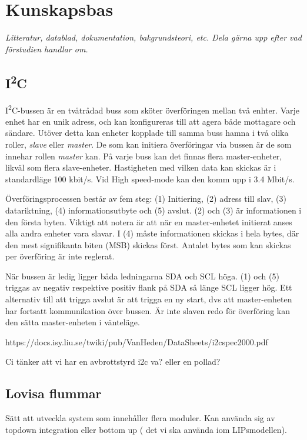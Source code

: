 \documentclass[11pt]{article}
\begin{document}
\begin{flushleft}
\begin{itemize}
\end{itemize}

\pagebreak

\section{Kunskapsbas}
\textit{Litteratur, datablad, dokumentation, bakgrundsteori, etc. Dela gärna upp efter vad förstudien handlar om.}

\subsection{I\textsuperscript{2}C}
I\textsuperscript{2}C-bussen är en tvåtrådad buss som sköter överföringen mellan två enhter. Varje enhet har en unik adress, och kan konfigureras till att agera både mottagare och sändare. Utöver detta kan enheter kopplade till samma buss hamna i två olika roller, \textit{slave} eller \textit{master}. De som kan initiera överföringar via bussen är de som innehar rollen \textit{master} kan. På varje buss kan det finnas flera master-enheter, likväl som flera slave-enheter. Hastigheten med vilken data kan skickas är i standardläge 100 kbit/s. Vid High speed-mode kan den komm upp i 3.4 Mbit/s.

Överföringsprocessen består av fem steg: (1) Initiering, (2) adress till slav, (3) datariktning, (4) informationsutbyte och (5) avslut. (2) och (3) är informationen i den första byten. Viktigt att notera är att när en master-enhetet initierat anses alla andra enheter vara slavar. I (4) måste informationen skickas i hela bytes, där den mest signifikanta biten (MSB) skickas först. Antalet bytes som kan skickas per överföring är inte reglerat.

När bussen är ledig ligger båda ledningarna SDA och SCL höga. (1) och (5) triggas av negativ respektive positiv flank på SDA så länge SCL ligger hög. Ett alternativ till att trigga avslut är att trigga en ny start, dvs att master-enheten har fortsatt kommunikation över bussen. Är inte slaven redo för överföring kan den sätta master-enheten i vänteläge.

https://docs.isy.liu.se/twiki/pub/VanHeden/DataSheets/i2cspec2000.pdf

Ci tänker att vi har en avbrottstyrd i2c va? eller en pollad?


\subsection{Lovisa flummar}
Sätt att utveckla system som innehåller flera moduler.
Kan använda sig av topdown integration eller bottom up ( det vi ska använda iom LIPsmodellen).


\end{flushleft}
\end{document}
